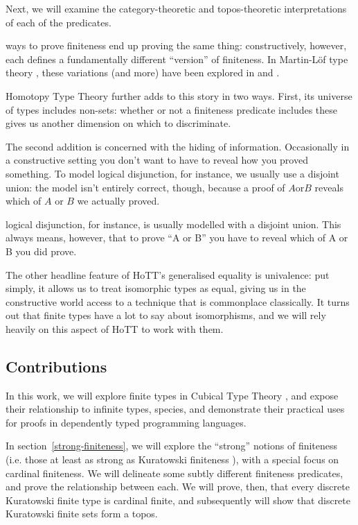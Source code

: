 

Next, we will examine the category-theoretic and topos-theoretic interpretations
of each of the predicates.

ways to prove finiteness end up proving the same
thing: constructively, however, each defines a fundamentally different
``version'' of finiteness.
In Martin-Löf type theory \cite{martin-lofIntuitionisticTypeTheory1980}, these
variations (and more) have been explored in
\cite{spiwackConstructivelyFinite2010} and
\cite{firsovVariationsNoetherianness2016}.

Homotopy Type Theory \cite{hottbook} further adds to this story in two ways.
First, its universe of types includes non-sets: whether or not a finiteness
predicate includes these gives us another dimension on which to discriminate.

The second addition is concerned with the hiding of information.
Occasionally in a constructive setting you don't want to have to reveal how you
proved something.
To model logical disjunction, for instance, we usually use a disjoint union: the
model isn't entirely correct, though, because a proof of \(A \text{or} B\)
reveals which of \(A\) or \(B\) we actually proved.

logical disjunction, for instance, is usually modelled with a
disjoint union.
This always means, however, that to prove ``A or B'' you have to reveal which of
A or B you did prove.



The other headline feature of HoTT's generalised equality is univalence: put
simply, it allows us to treat isomorphic types as equal, giving us in the
constructive world access to a technique that is commonplace classically.
It turns out that finite types have a lot to say about isomorphisms, and we will
rely heavily on this aspect of HoTT to work with them.
\subsection{Contributions}
In this work, we will explore finite types in Cubical Type Theory
\cite{cohenCubicalTypeTheory2016}, and expose their relationship to infinite
types, species, and demonstrate their practical uses for proofs in dependently
typed programming languages.

In section~\ref{strong-finiteness}, we will explore the ``strong'' notions of
finiteness (i.e. those at least as strong as Kuratowski finiteness
\cite{kuratowskiNotionEnsembleFini1920}), with a special focus on cardinal
finiteness.
We will delineate some subtly different finiteness predicates, and prove the
relationship between each.
We will prove, then, that every discrete Kuratowski finite type is cardinal
finite, and subsequently will show that discrete Kuratowski finite sets form a
topos.

